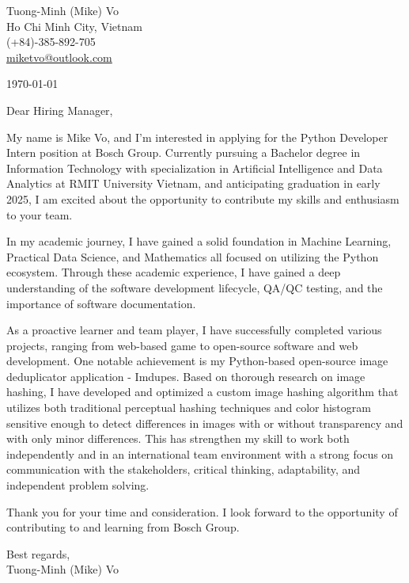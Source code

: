 \documentclass[a4paper,11pt]{article}
\makeatletter
\newcommand{\header}{
    \small{
        Tuong-Minh (Mike) Vo\\
        Ho Chi Minh City, Vietnam\\
        (+84)-385-892-705\\
        \href{miketvo@outlook.com}{miketvo@outlook.com}
    }
    \par\noindent\hrulefill
}
\newcommand{\p}[1]{#1\\\vspace{6pt}}
\makeatother
\begin{document}
\header

\p{\today}

\p{Dear Hiring Manager,}

\p{My name is Mike Vo, and I'm interested in applying for the Python Developer Intern position at Bosch Group. Currently pursuing a Bachelor degree in Information Technology with specialization in Artificial Intelligence and Data Analytics at RMIT University Vietnam, and anticipating graduation in early 2025, I am excited about the opportunity to contribute my skills and enthusiasm to your team.}

\p{In my academic journey, I have gained a solid foundation in Machine Learning, Practical Data Science, and Mathematics all focused on utilizing the Python ecosystem. Through these academic experience, I have gained a deep understanding of the software development lifecycle, QA/QC testing, and the importance of software documentation.}

\p{As a proactive learner and team player, I have successfully completed various projects, ranging from web-based game to open-source software and web development. One notable achievement is my Python-based open-source image deduplicator application - Imdupes. Based on thorough research on image hashing, I have developed and optimized a custom image hashing algorithm that utilizes both traditional perceptual hashing techniques and color histogram sensitive enough to detect differences in images with or without transparency and with only minor differences. This has strengthen my skill to work both independently and in an international team environment with a strong focus on communication with the stakeholders, critical thinking, adaptability, and independent problem solving.}

\p{Thank you for your time and consideration. I look forward to the opportunity of contributing to and learning from Bosch Group.}

\p{Best regards,\\
Tuong-Minh (Mike) Vo}
\end{document}
